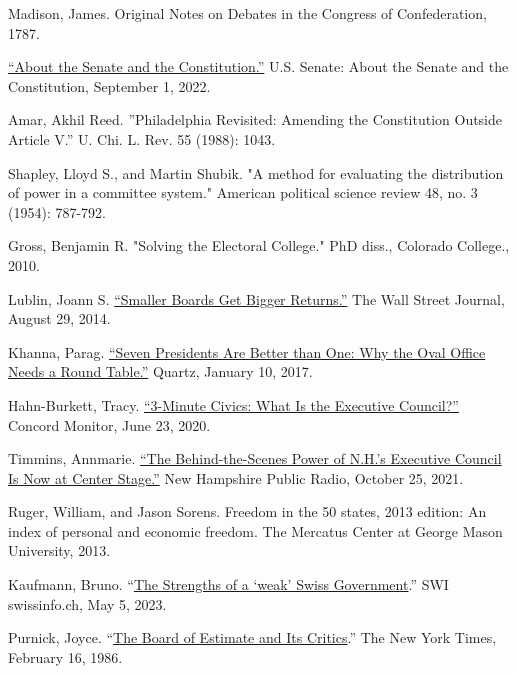 \documentclass{article}
\begin{document}
\begin{thebibliography}{20}
Madison, James. Original Notes on Debates in the Congress of Confederation, 1787.

\href{https://www.senate.gov/about/origins-foundations/senate-and-constitution.htm}{“About the Senate and the Constitution.”} U.S. Senate: About the Senate and the Constitution, September 1, 2022.

Amar, Akhil Reed. ”Philadelphia Revisited: Amending the Constitution Outside Article V.” U. Chi. L. Rev. 55 (1988): 1043.

Shapley, Lloyd S., and Martin Shubik. "A method for evaluating the distribution of power in a committee system." American political science review 48, no. 3 (1954): 787-792.

Gross, Benjamin R. "Solving the Electoral College." PhD diss., Colorado College., 2010.

Lublin, Joann S. \href{https://www.wsj.com/articles/smaller-boards-get-bigger-returns-1409078628}{“Smaller Boards Get Bigger Returns.”} The Wall Street Journal, August 29, 2014. 

Khanna, Parag. \href{https://qz.com/876260/seven-presidents-are-better-than-one-why-the-oval-office-needs-a-round-table}{“Seven Presidents Are Better than One: Why the Oval Office Needs a Round Table.”} Quartz, January 10, 2017.

Hahn-Burkett, Tracy. \href{https://www.concordmonitor.com/What-is-the-Executive-Council-34817477}{“3-Minute Civics: What Is the Executive Council?”} Concord Monitor, June 23, 2020.

Timmins, Annmarie. \href{https://www.nhpr.org/nh-news/2021-10-25/executive-council}{“The Behind-the-Scenes Power of N.H.’s Executive Council Is Now at Center Stage.”} New Hampshire Public Radio, October 25, 2021. 

Ruger, William, and Jason Sorens. Freedom in the 50 states, 2013 edition: An index of personal and economic freedom. The Mercatus Center at George Mason University, 2013.

Kaufmann, Bruno. “\href{https://www.swissinfo.ch/eng/business/the-strengths-of-a--weak--swiss-government/48483858. }{The Strengths of a ‘weak’ Swiss Government}.” SWI swissinfo.ch, May 5, 2023. 

Purnick, Joyce. “\href{https://www.nytimes.com/1986/02/16/weekinreview/the-board-of-estimate-and-its-critics.html}{The Board of Estimate and Its Critics}.” The New York Times, February 16, 1986.


\end{thebibliography}
\end{document}
